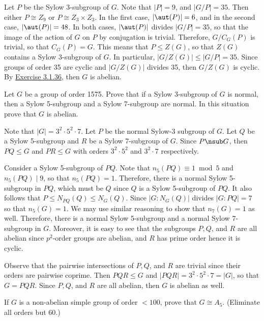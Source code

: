 \begin{sol}
	Let $P$ be the Sylow 3-subgroup of $G$. Note that $|P| = 9$, and $|G/P| = 35$. Then either $P \cong Z_9$ or $P \cong Z_3 \times Z_3$. In the first case, $|\aut(P)| = 6$, and in the second case, $|\aut(P)| = 48$. In both cases, $|\aut(P)|$ divides $|G/P| = 35$, so that the image of the action of $G$ on $P$ by conjugation is trivial. Therefore, $G/C_G(P)$ is trivial, so that $C_G(P) = G$. This means that $P \leq Z(G)$, so that $Z(G)$ contains a Sylow 3-subgroup of $G$. In particular, $|G/Z(G)| \leq |G/P| = 35$. Since groups of order 35 are cyclic and $|G/Z(G)|$ divides 35, then $G/Z(G)$ is cyclic. By \hyperref[ex3.1.36]{Exercise 3.1.36}, then $G$ is abelian.
\end{sol}

\begin{exercise}\label{ex4.5.28}
	Let $G$ be a group of order 1575. Prove that if a Sylow 3-subgroup of $G$ is normal, then a Sylow 5-subgroup and a Sylow 7-subgroup are normal. In this situation prove that $G$ is abelian.
\end{exercise}

\begin{sol}
	Note that $|G| = 3^2 \cdot 5^2 \cdot 7$. Let $P$ be the normal Sylow-3 subgroup of $G$. Let $Q$ be a Sylow 5-subgroup and $R$ be a Sylow 7-subgroup of $G$. Since $P \nsub G$, then $PQ \leq G$ and $PR \leq G$ with orders $3^2 \cdot 5^2$ and $3^2 \cdot 7$ respectively. 

	Consider a Sylow 5-subgroup of $PQ$. Note that $n_5(PQ) \equiv 1 \bmod 5$ and $n_5(PQ) \mid 9$, so that $n_5(PQ) = 1$. Therefore, there is a normal Sylow 5-subgroup in $PQ$, which must be $Q$ since $Q$ is a Sylow 5-subgroup of $PQ$. It also follows that $P \leq N_{PQ}(Q) \leq N_G(Q)$. Since $|G : N_G(Q)|$ divides $|G : PQ| = 7$ so that $n_5(G) = 1$. We may use similar reasoning to show that $n_7(G) = 1$ as well. Therefore, there is a normal Sylow 5-subgroup and a normal Sylow 7-subgroup in $G$. Moreover, it is easy to see that the subgroups $P, Q$, and $R$ are all abelian since $p^2$-order groups are abelian, and $R$ has prime order hence it is cyclic.

	Observe that the pairwise intersections of $P, Q$, and $R$ are trivial since their orders are pairwise coprime. Then $PQR \leq G$ and $|PQR| = 3^2 \cdot 5^2 \cdot 7 = |G|$, so that $G = PQR$. Since $P, Q$, and $R$ are all abelian, then $G$ is abelian as well.
\end{sol}

\begin{specialexercise}\label{ex4.5.29}
	If $G$ is a non-abelian simple group of order $< 100$, prove that $G \cong A_5$. (Eliminate all orders but 60.)
\end{specialexercise}

